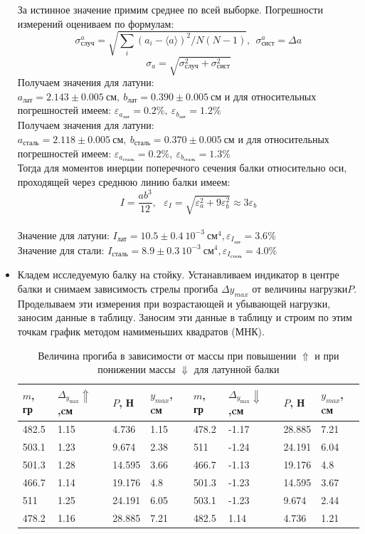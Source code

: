 \documentclass[a4paper,12pt]{article} %
\begin{document}
\begin{itemize}
За истинное значение примим среднее по всей выборке. Погрешности измерений оцениваем по формулам:
    $$\sigma^a_\text{случ}=\sqrt{\sum_{i} (a_{i}-\langle a \rangle)^2 /N(N-1)}, \ \ \sigma^a_\text{сист}=\Delta a$$
$$\sigma_{a}=\sqrt{\sigma^2_\text{случ}+\sigma^2_\text{сист}}$$
Получаем значения для латуни: $a_{\text{лат}} = 2.143 \pm 0.005 \ \text{см},\  b_{\text{лат}}=0.390 \pm 0.005 \ \text{см}$
и для относительных погрешностей имеем: $\varepsilon_{a_{\text{лат}}}=0.2 \%, \  \varepsilon_{b_{\text{лат}}} = 1.2 \% $\\
Получаем значения для латуни: $a_{\text{сталь}} = 2.118 \pm 0.005 \ \text{см},\  b_{\text{сталь}}=0.370 \pm 0.005 \ \text{см}$
и для относительных погрешностей имеем: $\varepsilon_{a_{\text{сталь}}}=0.2 \%, \  \varepsilon_{b_{\text{сталь}}} = 1.3 \% $\\
Тогда для моментов инерции поперечного сечения балки относительно оси, проходящей через
среднюю линию балки имеем:
$$I=\frac{ab^3}{12},\ \ \ \varepsilon_{I}=\sqrt{\varepsilon^2_{a}+9\varepsilon_{b}^2}\approx 3 \varepsilon_{b}$$\\
Значение для латуни: $I_{\text{лат}} = 10.5 \pm 0.4\ 10^{-3} \ \text{см}^4, \varepsilon_{I_{\text{лат}}}=3.6 \% $\\
Значение для стали: $I_{\text{сталь}} = 8.9 \pm 0.3 \ 10^{-3} \ \text{см}^4, \varepsilon_{I_{\text{сталь}}}=4.0 \% $\\
    \item Кладем исследуемую балку на стойку. Устанавливаем индикатор в центре балки
 и снимаем зависимость стрелы прогиба $\Delta y_{max}$ от величины нагрузки$P$. Проделываем эти измерения
 при возрастающей и убывающей нагрузки, заносим данные в таблицу. Заносим эти данные в таблицу
 и строим по этим точкам график методом намименьших квадратов (МНК).

 \begin{table}[!h]
    \begin{center}
    \begin{tabular}{|l|l|l|l|l|l|l|l|}\hline
    $m$, гр & $\Delta_{y_{\text{max}}} \Uparrow $,cм & $P$, Н   & $y_{max}$, cм & $m$, гр & $\Delta_{y_{\text{max}}} \Downarrow $,cм & $P$, Н   & $y_{max}$, cм \\ \hline
    482.5 & 1.15  & 4.736  & 1.15  & 478.2  & -1.17   & 28.885 & 7.21 \\ \hline
    503.1 & 1.23  & 9.674  & 2.38  & 511    & -1.24   & 24.191 & 6.04 \\ \hline
    501.3 & 1.28  & 14.595 & 3.66  & 466.7  & -1.13   & 19.176 & 4.8  \\ \hline
    466.7 & 1.14  & 19.176 & 4.8   & 501.3  & -1.23   & 14.595 & 3.67 \\ \hline
    511   & 1.25  & 24.191 & 6.05  & 503.1  & -1.23   & 9.674  & 2.44 \\ \hline
    478.2 & 1.16  & 28.885 & 7.21  & 482.5  & 1.14    & 4.736  & 1.21 \\ \hline
    \end{tabular}
    \caption{Величина прогиба в зависимости от массы при повышении $\Uparrow $ и при понижении массы $\Downarrow $ для латунной балки}
    \end{center}
\end{table}


\end{itemize}
\end{document}
